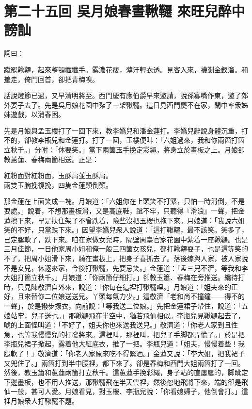 
\chapter*{第二十五回 吳月娘春晝鞦韆 來旺兒醉中謗訕}


詞曰：

\begin{myquote} 
蹴罷鞦韆，起來整頓纖纖手。露濃花瘦，薄汗輕衣透。見客入來，襪剗金釵溜。和羞走，倚門回首，卻把青梅嗅。

\end{myquote} 

話說燈節已過，又早清明將至。西門慶有應伯爵早來邀請，說孫寡嘴作東，邀了郊外耍子去了。先是吳月娘花園中紮了一架鞦韆。這日見西門慶不在家，閑中率衆姊妹遊戲，以消春困。

先是月娘與孟玉樓打了一回下來，教李嬌兒和潘金蓮打。李嬌兒辭說身體沉重，打不的，卻教李瓶兒和金蓮打。打了一回，玉樓便叫：「六姐過來，我和你兩箇打箇立秋千。」分咐：「休要笑。」當下兩箇玉手挽定彩繩，將身立於畫板之上。月娘卻教蕙蓮、春梅兩箇相送。正是：

\begin{myquote}
紅粉面對紅粉面，玉酥肩並玉酥肩。\\兩雙玉腕挽復挽，四隻金蓮顛倒顛。
\end{myquote}

那金蓮在上面笑成一塊。{}月娘道：「六姐你在上頭笑不打緊，只怕一時滑倒，不是耍處。」說着，不想那畫板滑，又是高底鞋，跐不牢，只聽得『滑浪』一聲，把金蓮擦下來，{}早是扶住架子不曾跌着，險些沒把玉樓也拖下來。月娘道：「我說六姐笑的不好，只當跌下來。」{}因望李嬌兒衆人說道：「這打鞦韆，最不該笑。笑多了，已定腿軟了，跌下來。咱在家做女兒時，隔壁周臺官家花園中紮着一座鞦韆。也是三月佳節，一日他家周小姐和俺一般三四箇女孩兒，都打鞦韆耍子，也是這等笑的不了，把周小姐滑下來，騎在畫板上，把身子喜抓去了。落後嫁與人家，被人家說不是女兒，休逐來家，今後打鞦韆，先要忌笑。」金蓮道：「孟三兒不濟，{}等我和李大姐打箇立秋千。」月娘道：「你兩箇仔細打。」卻教玉簫、春梅在旁推送。纔待打時，只見陳敬濟自外來，說道：「你每在這裡打鞦韆哩。」月娘道：「姐夫來的正好，且來替你二位娘送送兒。丫頭每氣力少。」這敬濟「老和尚不撞鐘——得不的一聲」，於是撥步撩衣，向前說：「等我送二位娘。」先把金蓮裙子帶住，說道：「五娘站牢，兒子送也。」那鞦韆飛在半空中，猶若飛仙相似。李瓶兒見鞦韆起去了，唬的上面怪叫道：「不好了，姐夫你也來送我送兒。」敬濟道：「你老人家到且性急，也等我慢慢兒的打發將來。這裡叫，那裡叫，把兒子手脚都弄慌了。」於是把李瓶兒裙子掀起，露着他大紅底衣，推了一把。李瓶兒道：「姐夫，慢慢着些！我腿軟了！」敬濟道：「你老人家原來吃不得緊酒。」金蓮又說：「李大姐，把我裙子又兜住了。」兩箇打到半中腰裡，都下來了。卻是春梅和西門大姐兩箇打了一回。然後，教玉簫和蕙蓮兩箇打立秋千。這蕙蓮手挽彩繩，身子站的直屢屢的，脚跐定下邊畫板，也不用人推送，那鞦韆飛在半天雲裡，然後忽地飛將下來，端的卻是飛仙一般，甚可人愛。{}月娘看見，對玉樓、李瓶兒說：「你看媳婦子，他倒會打。」這裡月娘衆人打鞦韆不題。

